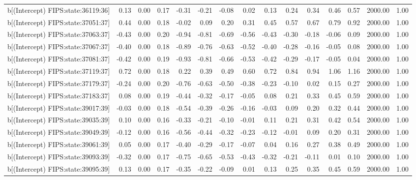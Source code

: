 \begin{table}[ht]
\begin{tabular}{rrrrrrrrrrrrrrr}
  b[(Intercept) FIPS:state:36119:36] & 0.13 & 0.00 & 0.17 & -0.31 & -0.21 & -0.08 & 0.02 & 0.13 & 0.24 & 0.34 & 0.46 & 0.57 & 2000.00 & 1.00 \\ 
  b[(Intercept) FIPS:state:37051:37] & 0.44 & 0.00 & 0.18 & -0.02 & 0.09 & 0.20 & 0.31 & 0.45 & 0.57 & 0.67 & 0.79 & 0.92 & 2000.00 & 1.00 \\ 
  b[(Intercept) FIPS:state:37063:37] & -0.43 & 0.00 & 0.20 & -0.94 & -0.81 & -0.69 & -0.56 & -0.43 & -0.30 & -0.18 & -0.06 & 0.09 & 2000.00 & 1.00 \\ 
  b[(Intercept) FIPS:state:37067:37] & -0.40 & 0.00 & 0.18 & -0.89 & -0.76 & -0.63 & -0.52 & -0.40 & -0.28 & -0.16 & -0.05 & 0.08 & 2000.00 & 1.00 \\ 
  b[(Intercept) FIPS:state:37081:37] & -0.42 & 0.00 & 0.19 & -0.93 & -0.81 & -0.66 & -0.53 & -0.42 & -0.29 & -0.17 & -0.05 & 0.04 & 2000.00 & 1.00 \\ 
  b[(Intercept) FIPS:state:37119:37] & 0.72 & 0.00 & 0.18 & 0.22 & 0.39 & 0.49 & 0.60 & 0.72 & 0.84 & 0.94 & 1.06 & 1.16 & 2000.00 & 1.00 \\ 
  b[(Intercept) FIPS:state:37179:37] & -0.24 & 0.00 & 0.20 & -0.76 & -0.63 & -0.50 & -0.38 & -0.23 & -0.10 & 0.02 & 0.15 & 0.27 & 2000.00 & 1.00 \\ 
  b[(Intercept) FIPS:state:37183:37] & 0.08 & 0.00 & 0.19 & -0.44 & -0.32 & -0.17 & -0.05 & 0.08 & 0.21 & 0.33 & 0.45 & 0.59 & 2000.00 & 1.00 \\ 
  b[(Intercept) FIPS:state:39017:39] & -0.03 & 0.00 & 0.18 & -0.54 & -0.39 & -0.26 & -0.16 & -0.03 & 0.09 & 0.20 & 0.32 & 0.44 & 2000.00 & 1.00 \\ 
  b[(Intercept) FIPS:state:39035:39] & 0.10 & 0.00 & 0.16 & -0.33 & -0.21 & -0.10 & -0.01 & 0.11 & 0.21 & 0.31 & 0.42 & 0.54 & 2000.00 & 1.00 \\ 
  b[(Intercept) FIPS:state:39049:39] & -0.12 & 0.00 & 0.16 & -0.56 & -0.44 & -0.32 & -0.23 & -0.12 & -0.01 & 0.09 & 0.20 & 0.31 & 2000.00 & 1.00 \\ 
  b[(Intercept) FIPS:state:39061:39] & 0.05 & 0.00 & 0.17 & -0.40 & -0.29 & -0.17 & -0.07 & 0.04 & 0.16 & 0.27 & 0.38 & 0.49 & 2000.00 & 1.00 \\ 
  b[(Intercept) FIPS:state:39093:39] & -0.32 & 0.00 & 0.17 & -0.75 & -0.65 & -0.53 & -0.43 & -0.32 & -0.21 & -0.11 & 0.01 & 0.10 & 2000.00 & 1.00 \\ 
  b[(Intercept) FIPS:state:39095:39] & 0.13 & 0.00 & 0.17 & -0.35 & -0.22 & -0.09 & 0.01 & 0.13 & 0.25 & 0.35 & 0.45 & 0.59 & 2000.00 & 1.00 \\ 

\end{tabular}
\end{table}
